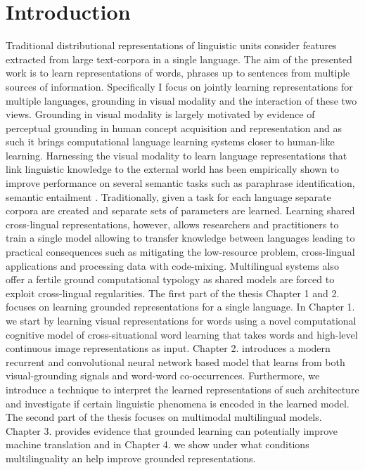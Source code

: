 

\chapter{Introduction}
\label{introduction}

Traditional distributional representations of linguistic units consider features extracted from large text-corpora in a single language.
The aim of the presented work is to learn representations of words, phrases up to sentences from multiple sources of information. Specifically I focus on jointly learning 
representations for multiple languages, grounding in visual modality and the interaction of these two views. 
Grounding in visual modality is largely motivated by evidence of perceptual grounding in human concept acquisition and representation \cite{barsalou2003grounding}
and as such it brings computational language learning systems closer to human-like learning. Harnessing the visual modality to learn language representations that link linguistic knowledge
to the external world \cite{kiela2014improving,baroni2016grounding,elliott2017imagination,kiela2017learning,yoo2017improving}  has been empirically shown to    
improve performance on several semantic tasks such as paraphrase identification, semantic entailment \cite{dolan2004unsupervised,marelli2014sick}.  
Traditionally, given a task for each language separate corpora are created and separate sets of parameters are learned. 
Learning shared cross-lingual representations, however, allows researchers and practitioners
to train a single model allowing to transfer knowledge between languages leading to practical consequences such as mitigating the low-resource problem, cross-lingual
applications and processing data with code-mixing. Multilingual systems also offer a fertile ground computational typology as shared models are forced to exploit cross-lingual 
regularities. 
The first part of the thesis Chapter 1 and 2. focuses on learning grounded representations for a single language. 
In Chapter 1. we start by learning visual representations for words  using a novel computational cognitive model of cross-situational word learning that takes words
and high-level continuous image representations as input. Chapter 2. introduces a modern recurrent and convolutional neural network based model that learns from both 
visual-grounding signals and word-word co-occurrences. Furthermore, we introduce a technique to interpret the learned representations of such architecture and investigate 
if certain linguistic phenomena is encoded in the learned model. The second part of the thesis focuses on multimodal multilingual models. Chapter 3. provides evidence 
that grounded learning can potentially improve machine translation and  in Chapter 4. we show under what conditions multilinguality an help improve grounded representations. 

